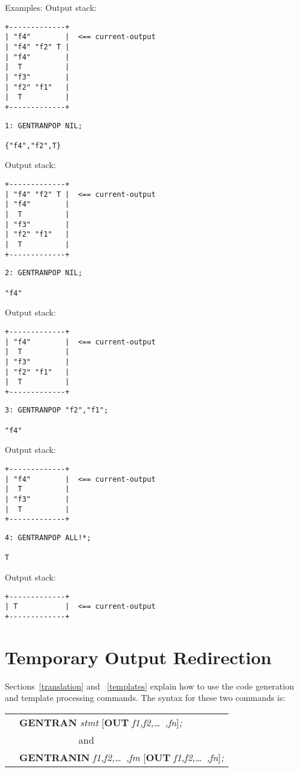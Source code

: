 \begin{describe}{Examples:}
Output stack:
\begin{verbatim}
+-------------+
| "f4"        |  <== current-output
| "f4" "f2" T |
| "f4"        |
|  T          |
| "f3"        |
| "f2" "f1"   |
|  T          |
+-------------+
\end{verbatim}
\begin{verbatim}
1: GENTRANPOP NIL; 

{"f4","f2",T}
\end{verbatim}
Output stack:
\begin{verbatim}
+-------------+
| "f4" "f2" T |  <== current-output
| "f4"        |
|  T          |
| "f3"        |
| "f2" "f1"   |
|  T          |
+-------------+
\end{verbatim}
\begin{verbatim}
2: GENTRANPOP NIL; 

"f4"
\end{verbatim}
Output stack:
\begin{verbatim}
+-------------+
| "f4"        |  <== current-output
|  T          |
| "f3"        |
| "f2" "f1"   |
|  T          |
+-------------+
\end{verbatim}
\begin{verbatim}
3: GENTRANPOP "f2","f1"; 

"f4"
\end{verbatim}
Output stack:
\begin{verbatim}
+-------------+
| "f4"        |  <== current-output
|  T          |
| "f3"        |
|  T          |
+-------------+
\end{verbatim}
\begin{verbatim}
4: GENTRANPOP ALL!*; 

T
\end{verbatim}
Output stack:
\begin{verbatim}
+-------------+
| T           |  <== current-output
+-------------+
\end{verbatim}
\end{describe}

\section{Temporary Output Redirection}
Sections~\ref{translation} and ~\ref{templates}
explain how to use the code generation and
template processing commands.  The syntax for these two commands
is:

\begin{tabular}{lll}
&\multicolumn{2}{l}{{\bf GENTRAN} {\it stmt\/} [{\bf OUT} {\it f1,f2,\dots\ ,fn\/}]{\it ;}}\\
&&and\\
&\multicolumn{2}{l}{{\bf GENTRANIN} {\it f1,f2,\dots\ ,fm\/} [{\bf OUT} {\it  f1,f2,\dots\ ,fn\/}]{\it ;}}\\
\end{tabular}

